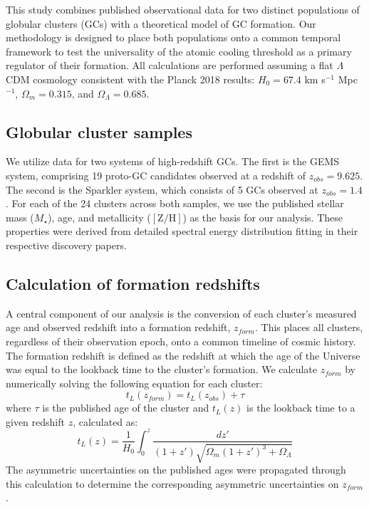 \documentclass[]{article}
\begin{document}
This study combines published observational data for two distinct populations of globular clusters (GCs) with a theoretical model of GC formation. Our methodology is designed to place both populations onto a common temporal framework to test the universality of the atomic cooling threshold as a primary regulator of their formation. All calculations are performed assuming a flat $\Lambda$CDM cosmology consistent with the Planck 2018 results: $H_0 = 67.4$ km s$^{-1}$ Mpc$^{-1}$, $\Omega_m = 0.315$, and $\Omega_\Lambda = 0.685$.

\subsection{Globular cluster samples}
We utilize data for two systems of high-redshift GCs. The first is the GEMS system, comprising 19 proto-GC candidates observed at a redshift of $z_{obs} = 9.625$. The second is the Sparkler system, which consists of 5 GCs observed at $z_{obs} = 1.4$. For each of the 24 clusters across both samples, we use the published stellar mass ($M_\star$), age, and metallicity ($[\mathrm{Z/H}]$) as the basis for our analysis. These properties were derived from detailed spectral energy distribution fitting in their respective discovery papers.

\subsection{Calculation of formation redshifts}
A central component of our analysis is the conversion of each cluster's measured age and observed redshift into a formation redshift, $z_{form}$. This places all clusters, regardless of their observation epoch, onto a common timeline of cosmic history. The formation redshift is defined as the redshift at which the age of the Universe was equal to the lookback time to the cluster's formation. We calculate $z_{form}$ by numerically solving the following equation for each cluster:
\begin{equation}
    t_L(z_{form}) = t_L(z_{obs}) + \tau
\end{equation}
where $\tau$ is the published age of the cluster and $t_L(z)$ is the lookback time to a given redshift $z$, calculated as:
\begin{equation}
    t_L(z) = \frac{1}{H_0} \int_0^z \frac{dz'}{(1+z')\sqrt{\Omega_m(1+z')^3 + \Omega_\Lambda}}
\end{equation}
The asymmetric uncertainties on the published ages were propagated through this calculation to determine the corresponding asymmetric uncertainties on $z_{form}$.
\end{document}
